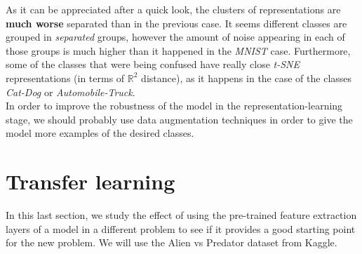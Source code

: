 \documentclass[a4paper]{article}
\begin{document}
\begin{itemize}
        As it can be appreciated after a quick look, the clusters of representations are \textbf{much worse} separated than in the previous case. It seems different classes are grouped in \emph{separated} groups, however the amount of noise appearing in each of those groups is much higher than it happened in the \emph{MNIST} case. Furthermore, some of the classes that were being confused have really close \emph{t-SNE} representations (in terms of \(\mathbb R^2\) distance), as it happens in the case of the classes \emph{Cat-Dog} or \emph{Automobile-Truck}.\\

        In order to improve the robustness of the model in the representation-learning stage, we should probably use data augmentation techniques in order to give the model more examples of the desired classes.
\end{itemize}

\section{Transfer learning}

In this last section, we study the effect of using the pre-trained feature extraction layers of a model in a different problem to see if it provides a good starting point for the new problem. We will use the Alien vs Predator dataset from Kaggle.
\end{document}
